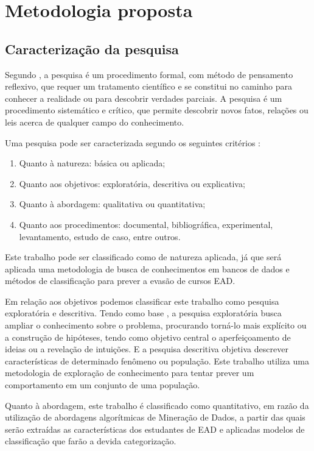 \chapter{Metodologia proposta}

\section{Caracterização da pesquisa}

Segundo , a pesquisa é um procedimento
formal, com método de pensamento reflexivo, que requer um tratamento científico
e se constitui no caminho para conhecer a realidade ou para descobrir verdades
parciais. A pesquisa é um procedimento sistemático e crítico,  que permite
descobrir novos fatos, relações ou leis acerca de qualquer campo do
conhecimento.

Uma pesquisa pode ser caracterizada segundo os seguintes critérios
\cite{gil2008metodos}:
\begin{enumerate}[label=\alph*)]
  \item Quanto à natureza: básica ou aplicada;
  \item Quanto aos objetivos: exploratória, descritiva ou explicativa;
  \item Quanto à abordagem: qualitativa ou quantitativa;
  \item Quanto aos procedimentos: documental, bibliográfica, experimental,
  levantamento, estudo de caso, entre outros.
\end{enumerate}

Este trabalho pode ser classificado como de natureza aplicada, já que será
aplicada uma metodologia de busca de conhecimentos em bancos de dados e métodos
de classificação para prever a evasão de cursos EAD.

Em relação aos objetivos podemos classificar este trabalho como pesquisa
exploratória e descritiva. Tendo como base , a
pesquisa exploratória busca ampliar o conhecimento sobre o problema, procurando
torná-lo mais explícito ou a construção de hipóteses, tendo como objetivo
central o aperfeiçoamento de ideias ou a revelação de intuições. E a pesquisa
descritiva objetiva descrever características de determinado fenômeno ou
população. Este trabalho utiliza uma metodologia de exploração de conhecimento
para tentar prever um comportamento em um conjunto de uma população.

Quanto à abordagem, este trabalho é classificado como quantitativo, em razão da
utilização de abordagens algorítmicas de Mineração de Dados, a partir das quais
serão extraídas as características dos estudantes de EAD e aplicadas modelos de
classificação que farão a devida categorização.

